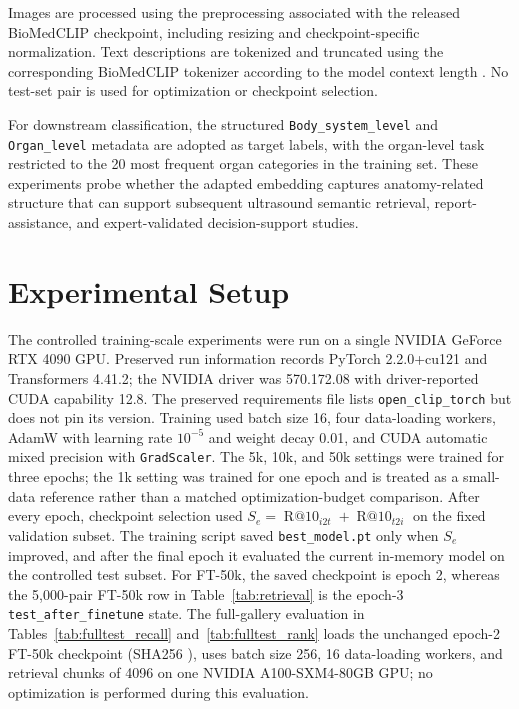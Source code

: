 \documentclass[runningheads]{llncs}
\begin{document}
Images are processed using the preprocessing associated with the released BioMedCLIP checkpoint, including resizing and checkpoint-specific normalization. Text descriptions are tokenized and truncated using the corresponding BioMedCLIP tokenizer according to the model context length \cite{zhang2023biomedclip}. No test-set pair is used for optimization or checkpoint selection.

For downstream classification, the structured \texttt{Body\_system\_level} and \texttt{Organ\_level} metadata are adopted as target labels, with the organ-level task restricted to the 20 most frequent organ categories in the training set. These experiments probe whether the adapted embedding captures anatomy-related structure that can support subsequent ultrasound semantic retrieval, report-assistance, and expert-validated decision-support studies.

\section{Experimental Setup}

The controlled training-scale experiments were run on a single NVIDIA GeForce RTX 4090 GPU. Preserved run information records PyTorch 2.2.0+cu121 and Transformers 4.41.2; the NVIDIA driver was 570.172.08 with driver-reported CUDA capability 12.8. The preserved requirements file lists \texttt{open\_clip\_torch} but does not pin its version. Training used batch size 16, four data-loading workers, AdamW with learning rate $10^{-5}$ and weight decay 0.01, and CUDA automatic mixed precision with \texttt{GradScaler}. The 5k, 10k, and 50k settings were trained for three epochs; the 1k setting was trained for one epoch and is treated as a small-data reference rather than a matched optimization-budget comparison. After every epoch, checkpoint selection used $S_e=\operatorname{R@10}_{i2t}+\operatorname{R@10}_{t2i}$ on the fixed validation subset. The training script saved \texttt{best\_model.pt} only when $S_e$ improved, and after the final epoch it evaluated the current in-memory model on the controlled test subset. For FT-50k, the saved checkpoint is epoch 2, whereas the 5,000-pair FT-50k row in Table~\ref{tab:retrieval} is the epoch-3 \texttt{test\_after\_finetune} state. The full-gallery evaluation in Tables~\ref{tab:fulltest_recall} and~\ref{tab:fulltest_rank} loads the unchanged epoch-2 FT-50k checkpoint (SHA256 \texttt{}), uses batch size 256, 16 data-loading workers, and retrieval chunks of 4096 on one NVIDIA A100-SXM4-80GB GPU; no optimization is performed during this evaluation.
\end{document}
